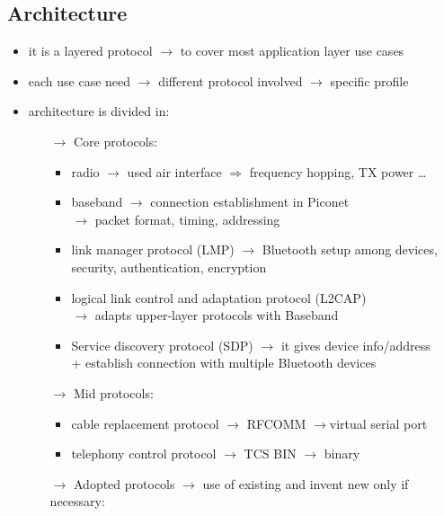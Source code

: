 \subsection{Architecture}
\begin{itemize}
    \item it is a layered protocol $\rightarrow$ to cover most application layer use cases
    \item each use case need $\rightarrow$ different protocol involved $\rightarrow$ specific profile
    \item architecture is divided in:
    \begin{itemize}
        \item[$\rightarrow$] Core protocols:
        \begin{itemize}
            \item radio $\rightarrow$ used air interface $\Rightarrow$ frequency
            hopping, TX power \dots
            \item baseband $\rightarrow$ connection establishment in Piconet\\
            $\rightarrow$ packet format, timing, addressing
            \item link manager protocol (LMP) $\rightarrow$ Bluetooth setup among
            devices,\\security, authentication, encryption
            \item logical link control and adaptation protocol (L2CAP)\\
            $\rightarrow$ adapts upper-layer protocols with Baseband
            \item Service discovery protocol (SDP) $\rightarrow$ it gives device info/address\\
            + establish connection with multiple Bluetooth devices
        \end{itemize} 
        \item[$\rightarrow$] Mid protocols:
        \begin{itemize}
            \item cable replacement protocol $\rightarrow$ RFCOMM $\rightarrow$virtual serial port
            \item telephony control protocol $\rightarrow$ TCS BIN $\rightarrow$ binary
        \end{itemize}
        \item[$\rightarrow$] Adopted protocols $\rightarrow$ use of existing and invent new only if necessary:
        \begin{itemize}

\end{itemize}
\end{itemize}
\end{itemize}
